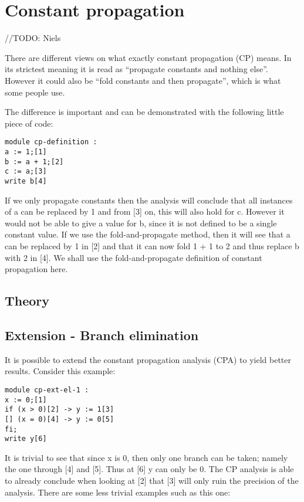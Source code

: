\section{Constant propagation}
//TODO: Niels

There are different views on what exactly constant propagation (CP) means. In its
strictest meaning it is read as ``propagate constants and nothing else''.
However it could also be ``fold constants and then propagate'', which is what
some people use.

  The difference is important and can be demonstrated with the following little
piece of code:

\begin{lstlisting}
module cp-definition :
a := 1;[1]
b := a + 1;[2]
c := a;[3]
write b[4]
\end{lstlisting}

If we only propagate constants then the analysis will conclude that all instances
of a can be replaced by 1 and from [3] on, this will also hold for c. However it
would not be able to give a value for b, since it is not defined to be a 
single constant value.
  If we use the fold-and-propagate method, then it will see that a can be replaced
by 1 in [2] and that it can now fold 1 + 1 to 2 and thus replace b with 2 in [4].
We shall use the fold-and-propagate definition of constant propagation here.

\subsection{Theory}

\subsection{Extension - Branch elimination}
It is possible to extend the constant propagation analysis (CPA) to yield better
results. Consider this example:

\begin{lstlisting}
module cp-ext-el-1 :
x := 0;[1]
if (x > 0)[2] -> y := 1[3]
[] (x = 0)[4] -> y := 0[5]
fi;
write y[6]
\end{lstlisting}

\docpar
It is trivial to see that since x is 0, then only one branch can be taken; namely
the one through [4] and [5]. Thus at [6] y can only be 0. The CP analysis is able
to already conclude when looking at [2] that [3] will only ruin the precision
of the analysis.
  There are some less trivial examples such as this one:

